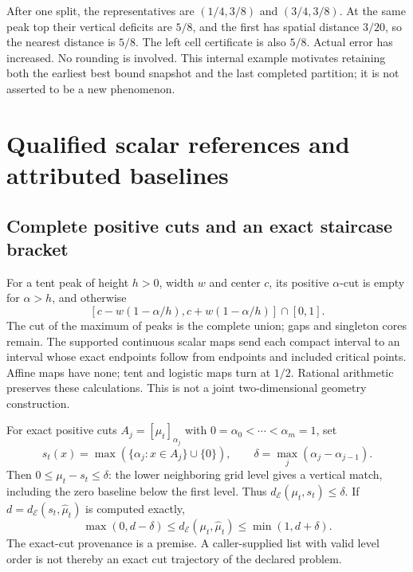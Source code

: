 \documentclass[10pt,a4paper]{article}
\newcommand{\E}{\mathcal{E}}
\newcommand{\dE}{d_{\E}}
\begin{document}
After one split, the representatives are $(1/4,3/8)$ and $(3/4,3/8)$.
At the same peak top their vertical deficits are $5/8$, and the first has
spatial distance $3/20$, so the nearest distance is $5/8$. The left cell
certificate is also $5/8$. Actual error has increased. No rounding is involved.
This internal example motivates retaining both the earliest best bound
snapshot and the last completed partition; it is not asserted to be a new
phenomenon.

\section{Qualified scalar references and attributed baselines}
\subsection{Complete positive cuts and an exact staircase bracket}
For a tent peak of height $h>0$, width $w$ and center $c$, its positive
$\alpha$-cut is empty for $\alpha>h$, and otherwise
\[
 [c-w(1-\alpha/h),c+w(1-\alpha/h)]\cap[0,1].
\]
The cut of the maximum of peaks is the complete union; gaps and singleton
cores remain. The supported continuous scalar maps send each compact interval
to an interval whose exact endpoints follow from endpoints and included
critical points. Affine maps have none; tent and logistic maps turn at $1/2$.
Rational arithmetic preserves these calculations. This is not a joint
two-dimensional geometry construction.

For exact positive cuts $A_j=[\mu_t]_{\alpha_j}$ with
$0=\alpha_0<\cdots<\alpha_m=1$, set
\[
 s_t(x)=\max(\{\alpha_j:x\in A_j\}\cup\{0\}),\qquad
 \delta=\max_j(\alpha_j-\alpha_{j-1}).
\]
Then $0\leq\mu_t-s_t\leq\delta$: the lower neighboring grid level gives a
vertical match, including the zero baseline below the first level.
Thus $\dE(\mu_t,s_t)\leq\delta$. If
$d=\dE(s_t,\widehat\mu_t)$ is computed exactly,
\begin{equation}\label{eq:bracket}
 \max(0,d-\delta)\leq\dE(\mu_t,\widehat\mu_t)\leq\min(1,d+\delta).
\end{equation}
The exact-cut provenance is a premise. A caller-supplied list with valid
level order is not thereby an exact cut trajectory of the declared problem.
\end{document}
